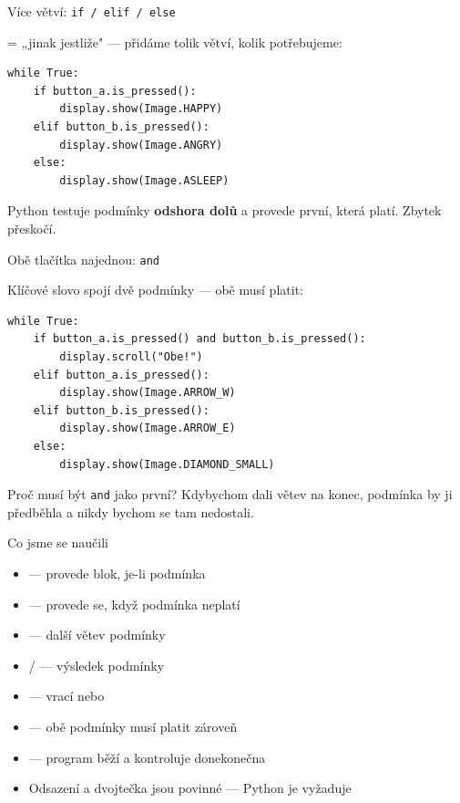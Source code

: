 \begin{frame}[fragile]{Více větví: \texttt{if / elif / else}}

   = „jinak jestliže" — přidáme tolik větví, kolik potřebujeme:

  \begin{lstlisting}
while True:
    if button_a.is_pressed():
        display.show(Image.HAPPY)
    elif button_b.is_pressed():
        display.show(Image.ANGRY)
    else:
        display.show(Image.ASLEEP)
  \end{lstlisting}

  \bigskip
  Python testuje podmínky \textbf{odshora dolů} a provede první, která platí.
  Zbytek přeskočí.
\end{frame}

\begin{frame}[fragile]{Obě tlačítka najednou: \texttt{and}}

  Klíčové slovo  spojí dvě podmínky — obě musí platit:

  \begin{lstlisting}
while True:
    if button_a.is_pressed() and button_b.is_pressed():
        display.scroll("Obe!")
    elif button_a.is_pressed():
        display.show(Image.ARROW_W)
    elif button_b.is_pressed():
        display.show(Image.ARROW_E)
    else:
        display.show(Image.DIAMOND_SMALL)
  \end{lstlisting}

  \pause\bigskip
  \begin{alertblock}{Proč musí být \texttt{and} jako první?}
    Kdybychom dali  větev na konec, podmínka 
    by ji předběhla a nikdy bychom se tam nedostali.
  \end{alertblock}
\end{frame}

\begin{frame}{Co jsme se naučili}
  \begin{itemize}
    \item[\checkmark]  — provede blok, je-li podmínka 
    \item[\checkmark]  — provede se, když podmínka neplatí
    \item[\checkmark]  — další větev podmínky
    \item[\checkmark]  /  — výsledek podmínky
    \item[\checkmark]  — vrací  nebo 
    \item[\checkmark]  — obě podmínky musí platit zároveň
    \item[\checkmark]  — program běží a kontroluje donekonečna
    \item[\checkmark] Odsazení a dvojtečka jsou povinné — Python je vyžaduje
  \end{itemize}
\end{frame}


